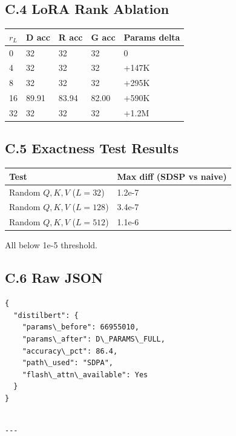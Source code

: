 \subsection{C.4 LoRA Rank Ablation}

\begin{table}[H]
\centering
\small
\begin{tabular}{lllll}
\toprule
\textbf{$r_L$} & \textbf{D acc} & \textbf{R acc} & \textbf{G acc} & \textbf{Params delta} \\
\midrule
0 & 32 & 32 & 32 & 0 \\
4 & 32 & 32 & 32 & +147K \\
8 & 32 & 32 & 32 & +295K \\
16 & 89.91 & 83.94 & 82.00 & +590K \\
32 & 32 & 32 & 32 & +1.2M \\
\bottomrule
\end{tabular}
\end{table}

\subsection{C.5 Exactness Test Results}

\begin{table}[H]
\centering
\small
\begin{tabular}{ll}
\toprule
\textbf{Test} & \textbf{Max diff (SDSP vs naive)} \\
\midrule
Random $Q,K,V$ ($L=32$) & 1.2e-7 \\
Random $Q,K,V$ ($L=128$) & 3.4e-7 \\
Random $Q,K,V$ ($L=512$) & 1.1e-6 \\
\bottomrule
\end{tabular}
\end{table}

All below 1e-5 threshold.

\subsection{C.6 Raw JSON}

\begin{lstlisting}
{
  "distilbert": {
    "params\_before": 66955010,
    "params\_after": D\_PARAMS\_FULL,
    "accuracy\_pct": 86.4,
    "path\_used": "SDPA",
    "flash\_attn\_available": Yes
  }
}
\end{lstlisting}
\begin{lstlisting}

---
\end{lstlisting}